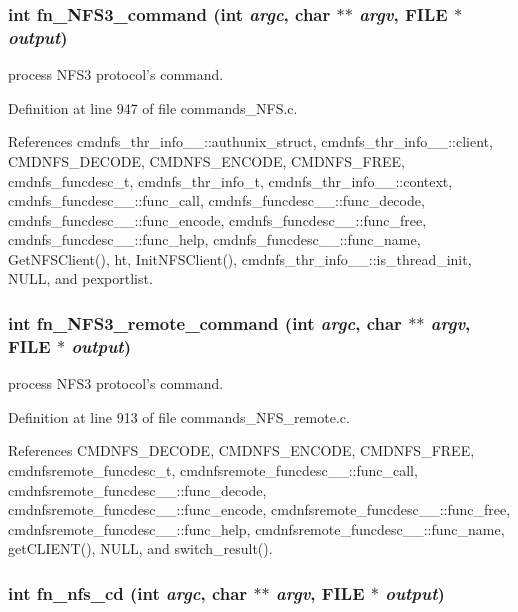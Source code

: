 \subsubsection{\setlength{\rightskip}{0pt plus 5cm}int fn\_\-NFS3\_\-command (int {\em argc}, char $\ast$$\ast$ {\em argv}, FILE $\ast$ {\em output})}\label{commands_8h_a64}


process NFS3 protocol's command. 

Definition at line 947 of file commands\_\-NFS.c.

References cmdnfs\_\-thr\_\-info\_\-\_\-::authunix\_\-struct, cmdnfs\_\-thr\_\-info\_\-\_\-::client, CMDNFS\_\-DECODE, CMDNFS\_\-ENCODE, CMDNFS\_\-FREE, cmdnfs\_\-funcdesc\_\-t, cmdnfs\_\-thr\_\-info\_\-t, cmdnfs\_\-thr\_\-info\_\-\_\-::context, cmdnfs\_\-funcdesc\_\-\_\-::func\_\-call, cmdnfs\_\-funcdesc\_\-\_\-::func\_\-decode, cmdnfs\_\-funcdesc\_\-\_\-::func\_\-encode, cmdnfs\_\-funcdesc\_\-\_\-::func\_\-free, cmdnfs\_\-funcdesc\_\-\_\-::func\_\-help, cmdnfs\_\-funcdesc\_\-\_\-::func\_\-name, Get\-NFSClient(), ht, Init\-NFSClient(), cmdnfs\_\-thr\_\-info\_\-\_\-::is\_\-thread\_\-init, NULL, and pexportlist.
\subsubsection{\setlength{\rightskip}{0pt plus 5cm}int fn\_\-NFS3\_\-remote\_\-command (int {\em argc}, char $\ast$$\ast$ {\em argv}, FILE $\ast$ {\em output})}\label{commands_8h_a85}


process NFS3 protocol's command. 

Definition at line 913 of file commands\_\-NFS\_\-remote.c.

References CMDNFS\_\-DECODE, CMDNFS\_\-ENCODE, CMDNFS\_\-FREE, cmdnfsremote\_\-funcdesc\_\-t, cmdnfsremote\_\-funcdesc\_\-\_\-::func\_\-call, cmdnfsremote\_\-funcdesc\_\-\_\-::func\_\-decode, cmdnfsremote\_\-funcdesc\_\-\_\-::func\_\-encode, cmdnfsremote\_\-funcdesc\_\-\_\-::func\_\-free, cmdnfsremote\_\-funcdesc\_\-\_\-::func\_\-help, cmdnfsremote\_\-funcdesc\_\-\_\-::func\_\-name, get\-CLIENT(), NULL, and switch\_\-result().
\subsubsection{\setlength{\rightskip}{0pt plus 5cm}int fn\_\-nfs\_\-cd (int {\em argc}, char $\ast$$\ast$ {\em argv}, FILE $\ast$ {\em output})}\label{commands_8h_a65}


